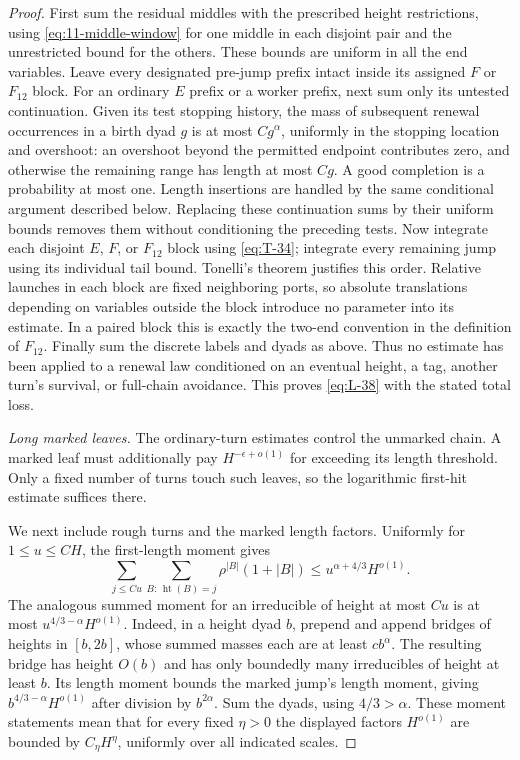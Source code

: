 \begin{proof}
First sum the residual middles with the prescribed height
restrictions, using \eqref{eq:11-middle-window} for one middle in
each disjoint pair and the unrestricted bound for the others.
These bounds are uniform in all the end variables. Leave every designated
pre-jump prefix intact inside its assigned $F$ or $F_{12}$ block.
For an ordinary $E$ prefix or a worker prefix, next sum only its
untested continuation. Given its test stopping history,
the mass of subsequent renewal occurrences in a birth dyad $g$ is
at most $Cg^\alpha$, uniformly in the stopping location and overshoot:
an overshoot beyond the permitted endpoint contributes zero, and
otherwise the remaining range has length at most $Cg$. A good
completion is a probability at most one. Length insertions are
handled by the same conditional argument described below. Replacing
these continuation sums by their uniform bounds removes them without
conditioning the preceding tests. Now integrate each disjoint $E$,
$F$, or $F_{12}$ block using \eqref{eq:T-34}; integrate every remaining
jump using its individual tail bound. Tonelli's theorem justifies this
order. Relative launches in each block are fixed neighboring ports,
so absolute translations depending on variables outside the block
introduce no parameter into its estimate. In a paired block this is
exactly the two-end convention in the definition of $F_{12}$.
Finally sum the discrete labels and dyads as above. Thus no estimate
has been applied to a renewal law conditioned on an eventual height,
a tag, another turn's survival, or full-chain avoidance. This proves
\eqref{eq:L-38} with the stated total loss.

\smallskip\noindent\emph{Long marked leaves.}
The ordinary-turn estimates control the unmarked chain. A marked leaf
must additionally pay $H^{-\epsilon+o(1)}$ for exceeding its length
threshold. Only a fixed number of turns touch such leaves, so the
logarithmic first-hit estimate suffices there.

We next include rough turns and the marked length factors. Uniformly
for $1\le u\le C H$, the first-length moment gives
\[
 \sum_{j\le Cu}\sum_{B:\,\operatorname{ht}(B)=j}
       \rho^{|B|}(1+|B|)
 \le u^{\alpha+4/3}H^{o(1)}.
\]
The analogous summed moment for an irreducible of height at most $Cu$
is at most $u^{4/3-\alpha}H^{o(1)}$. Indeed, in a height dyad $b$,
prepend and append bridges of heights in $[b,2b]$, whose summed
masses each are at least $cb^\alpha$. The resulting bridge has height
$O(b)$ and has only boundedly many irreducibles of height at least $b$.
Its length moment bounds the marked jump's length moment, giving
$b^{4/3-\alpha}H^{o(1)}$ after division by $b^{2\alpha}$.
Sum the dyads, using $4/3>\alpha$. These moment statements mean that
for every fixed $\eta>0$ the displayed factors $H^{o(1)}$ are bounded
by $C_\eta H^\eta$, uniformly over all indicated scales.


\end{proof}
